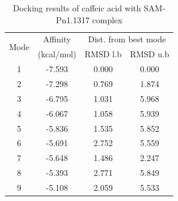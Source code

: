 \documentclass[12pt]{article}
\begin{document}
	\begin{table}[h]
		\centering
		\caption{\centering Docking results of caffeic acid with SAM-Pn1.1317 complex}
		\label{table4_2}
		\begin{tabular}{cccc}
			\toprule
			\multirow{2}{*}{Mode} & Affinity & \multicolumn{2}{c}{Dist. from best mode}\\
			&  (kcal/mol) & RMSD l.b & RMSD u.b\\
			\midrule
			1 & -7.593   &   0.000   &   0.000\\
			2 & -7.298   &   0.769   &   1.874\\
			3 & -6.795   &   1.031   &   5.968\\
			4 & -6.067   &   1.058   &   5.939\\
			5 & -5.836   &   1.535   &   5.852\\
			6 & -5.691   &   2.752   &   5.559\\
			7 & -5.648   &   1.486   &   2.247\\
			8 & -5.393   &   2.771   &   5.849\\
			9 & -5.108   &   2.059   &   5.533\\
			\bottomrule
			
		\end{tabular}
	\end{table}
	
\end{document}
